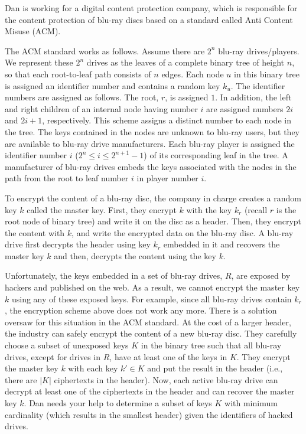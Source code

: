 \newcommand{\maxblurayslog}{62}
\newcommand{\maxhacked}{1000}


\setlength{\columnsep}{15pt}
%
Dan is working for a digital content protection company, which is responsible for the content protection of blu-ray discs based on a standard called Anti Content Misuse (ACM). 

The ACM standard works as follows. Assume there are $2^n$ blu-ray
drives/players. We represent these $2^n$ drives as the leaves of a
complete binary tree of height $n$, so that each root-to-leaf path
consists of $n$ edges.  Each node $u$ in this binary tree is assigned
an identifier number and contains a random key $k_u$. The identifier
numbers are assigned as follows. The root, $r$, is assigned $1$. In
addition, the left and right children of an internal node having
number $i$ are assigned numbers $2i$ and $2i+1$, respectively. This
scheme assigns a distinct number to each node in the tree. The keys
contained in the nodes are unknown to blu-ray users, but they are
available to blu-ray drive manufacturers. Each blu-ray player is
assigned the identifier number $i$ ($2^n \le i \le 2^{n+1}-1$) of its
corresponding leaf in the tree. A manufacturer of blu-ray drives
embeds the keys associated with the nodes in the path from the root to
leaf number $i$ in player number $i$.

To encrypt the content of a blu-ray disc, the company in charge
creates a random key $k$ called the master key. First, they encrypt
$k$ with the key $k_r$ (recall $r$ is the root node of binary tree)
and write it on the disc as a header. Then, they encrypt the content
with $k$, and write the encrypted data on the blu-ray disc. A blu-ray
drive first decrypts the header using key $k_r$ embedded in it and
recovers the master key $k$ and then, decrypts the content using the
key $k$.

Unfortunately, the keys embedded in a set of blu-ray drives, $R$, are
exposed by hackers and published on the web. As a result, we cannot
encrypt the master key $k$ using any of these exposed keys. For
example, since all blu-ray drives contain $k_r$, the encryption scheme
above does not work any more. There is a solution oversaw for this
situation in the ACM standard. At the cost of a larger header, the
industry can safely encrypt the content of a new blu-ray disc. They
carefully choose a subset of unexposed keys $K$ in the binary tree
such that all blu-ray drives, except for drives in $R$, have at least
one of the keys in $K$. They encrypt the master key $k$ with each key
$k' \in K$ and put the result in the header (i.e., there are $|K|$
ciphertexts in the header). Now, each active blu-ray drive can decrypt
at least one of the ciphertexts in the header and can recover the
master key $k$. Dan needs your help to determine a subset of keys $K$
with minimum cardinality (which results in the smallest header) given
the identifiers of hacked drives.

